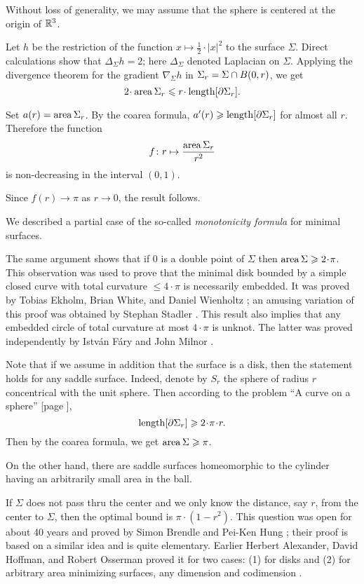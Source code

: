Without loss of generality, we may assume that the sphere is centered at the origin of $\mathbb{R}^3$.

Let $h$ be the restriction of the function $x\mapsto \tfrac12\cdot|x|^2$ to the surface $\Sigma$.
Direct calculations show that $\Delta_\Sigma h =  2$;
here $\Delta_\Sigma$ denoted Laplacian on $\Sigma$.
Applying the divergence theorem for the gradient $\nabla_\Sigma h$
in $\Sigma_r\z=\Sigma\cap B(0,r)$, we get
\[2\cdot \area\Sigma_r\le r\cdot\length [\partial\Sigma_r].\]

Set $a(r)=\operatorname{\rm area}\nolimits\Sigma_r$.
By the coarea formula, $a'(r)\geqslant\operatorname{\rm length} [\partial\Sigma_r]$ for almost all $r$.
Therefore the function
\[f\colon r\mapsto \frac{\operatorname{\rm area}\nolimits\Sigma_r}{r^2}
\]
is non-decreasing in the interval $(0,1)$.

Since $f(r)\to \pi$ as $r\to0$, the result follows.\qeds

We described a partial case of the so-called \emph{monotonicity formula} for minimal surfaces.

The same argument shows that if $0$ is a double point
of $\Sigma$ then $\area\Sigma\z\ge 2\cdot \pi$.
This observation was used to prove 
that the minimal disk bounded by a simple closed curve with total curvature $\le 4\cdot\pi$ 
is necessarily embedded.
It was proved by 
Tobias Ekholm, 
Brian White,
and Daniel Wienholtz
\cite{EWW};
an amusing variation of this proof
was obtained by 
Stephan Stadler \cite{stadler-FM}.
This result also implies that any embedded circle of total curvature at most $4\cdot\pi$ is unknot.
The latter was proved independently by Istv{\'a}n F{\'a}ry \cite{fary-knot} and  John Milnor \cite{milnor}.

Note that if we assume in addition that the surface is a disk,
then the statement holds for any saddle surface. 
Indeed, denote by $S_r$ the sphere of radius $r$ concentrical with the unit sphere. 
Then according to the problem ``A curve on a sphere'' [page \pageref{A curve in a sphere}], 
\[\length[\partial\Sigma_r]\ge 2\cdot\pi\cdot r.\]
Then by the coarea formula, we get $\operatorname{\rm area}\nolimits\Sigma\geqslant \pi$.

On the other hand, there are saddle surfaces homeomorphic to the cylinder
having an arbitrarily small area in the ball. 

If $\Sigma$ does not pass thru the center 
and we only know the distance, say $r$, 
from the center to $\Sigma$,
then the optimal bound is $\pi\cdot(1-r^2)$.
This question was open for about 40 years and proved by Simon Brendle and Pei-Ken Hung \cite{brende-hung};
their proof is based on a similar idea and is quite elementary.
Earlier Herbert Alexander, 
David Hoffman,
and Robert Osserman 
proved it for two cases: (1) for disks and (2) for arbitrary area minimizing surfaces, any dimension and codimension
 \cite{alexander-osserman,alexander-hoffman-osserman}.






